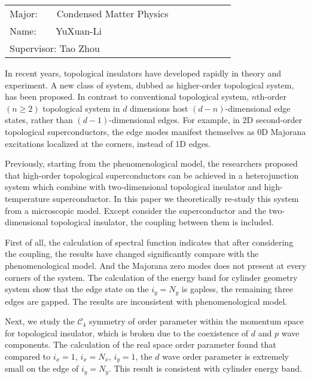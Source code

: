 \newpage
{\centering {}}
\bigskip
{
	\begin{center}
		\begin{tabular}{l}
			Major:$\quad\quad$Condensed Matter Physics$\quad\qquad$$\quad\qquad$\\
			Name:$\quad\quad$YuXuan-Li$\quad\qquad$$\quad\qquad$\\
			Supervisor: Tao Zhou$\quad\qquad$\\
		\end{tabular}
\end{center}}
\bigskip
\bigskip
\bigskip

{}

 In recent years, topological insulators have developed rapidly in theory and experiment.  A new class of system,
 dubbed as higher-order topological system, has been proposed. In contrast to conventional topological system, $n$th-order$(n\geq 2)$ topological system in $d$ dimensions host $(d-n)$-dimensional edge states, rather than $(d − 1)$-dimensional edges. For example, in 2D second-order topological superconductors, the edge modes manifest themselves as 0D Majorana excitations localized at the corners, instead of 1D edges.
 
Previously, starting from the phenomenological model, the researchers proposed that high-order topological superconductors can be achieved in a heterojunction system which combine with two-dimensional topological insulator and high-temperature superconductor. In this paper we theoretically re-study this system from a microscopic model. Except consider the superconductor and the two-dimensional topological insulator, the coupling between them is included.

First of all, the calculation of spectral function indicates that after considering the coupling, the results have changed significantly compare with the phenomenological model. And the Majorana zero modes does not present at every corners of the system. The calculation of the energy band for  cylinder geometry system show that the edge state on the $i_y=N_y$ is gapless, the remaining three edges are gapped. The results are inconsistent with phenomenological model.

Next, we study the $\mathcal{C}_4$ symmetry of order parameter within the momentum space for topological insulator,  which is broken due to the coexistence of $d$ and $p$ wave components. The calculation of the real space order parameter found that compared to $i_x=1$, $i_x=N_x$, $i_y=1$, the $d$ wave order parameter is extremely small on the edge of $i_y=N_y$. This result is consistent with cylinder energy band.

